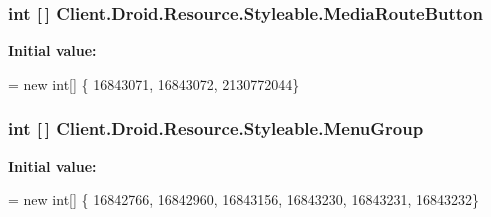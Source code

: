 \subsubsection[{Media\+Route\+Button}]{\setlength{\rightskip}{0pt plus 5cm}int \mbox{[}$\,$\mbox{]} Client.\+Droid.\+Resource.\+Styleable.\+Media\+Route\+Button\hspace{0.3cm}{\ttfamily [static]}}\label{classClient_1_1Droid_1_1Resource_1_1Styleable_a8e10ab39fa7c36fab0447a1a10fa35ea}
{\bfseries Initial value\+:}
\begin{DoxyCode}
= \textcolor{keyword}{new} \textcolor{keywordtype}{int}[]
            \{
                    16843071,
                    16843072,
                    2130772044\}
\end{DoxyCode}
\hypertarget{classClient_1_1Droid_1_1Resource_1_1Styleable_ad623aa0be8642415d99d67c33e2b6797}{}
\subsubsection[{Menu\+Group}]{\setlength{\rightskip}{0pt plus 5cm}int \mbox{[}$\,$\mbox{]} Client.\+Droid.\+Resource.\+Styleable.\+Menu\+Group\hspace{0.3cm}{\ttfamily [static]}}\label{classClient_1_1Droid_1_1Resource_1_1Styleable_ad623aa0be8642415d99d67c33e2b6797}
{\bfseries Initial value\+:}
\begin{DoxyCode}
= \textcolor{keyword}{new} \textcolor{keywordtype}{int}[]
            \{
                    16842766,
                    16842960,
                    16843156,
                    16843230,
                    16843231,
                    16843232\}
\end{DoxyCode}
\hypertarget{classClient_1_1Droid_1_1Resource_1_1Styleable_a457b0570e56ec16a97ee1dd48e676839}{}
